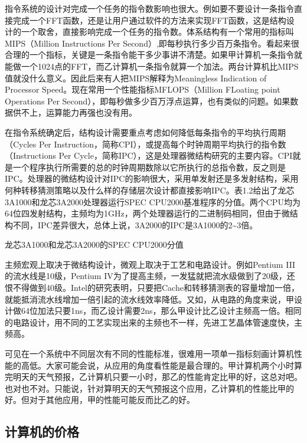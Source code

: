 \documentclass[]{ctexbook}
\begin{document}
指令系统的设计对完成一个任务的指令数影响也很大。例如要不要设计一条指令直接完成一个FFT函数，还是让用户通过软件的方法来实现FFT函数，这是结构设计的一个取舍，直接影响完成一个任务的指令数。体系结构有一个常用的指标叫MIPS（Million Instructions Per Second）,即每秒执行多少百万条指令。看起来很合理的一个指标，关键是一条指令能干多少事讲不清楚。如果甲计算机一条指令就能做一个1024点的FFT，而乙计算机一条指令就算一个加法。两台计算机比MIPS值就没什么意义。因此后来有人把MIPS解释为Meaningless Indication of Processor Speed。现在常用一个性能指标MFLOPS（Million FLoating point Operations Per Second），即每秒做多少百万浮点运算，也有类似的问题。如果数据供不上，运算能力再强也没有用。

在指令系统确定后，结构设计需要重点考虑如何降低每条指令的平均执行周期（Cycles Per Instruction，简称CPI），或提高每个时钟周期平均执行的指令数（Instructions Per Cycle，简称IPC），这是处理器微结构研究的主要内容。CPI就是一个程序执行所需要的总的时钟周期数除以它所执行的总指令数，反之则是IPC。处理器的微结构设计对IPC的影响很大，采用单发射还是多发射结构，采用何种转移猜测策略以及什么样的存储层次设计都直接影响IPC。表1.2给出了龙芯3A1000和龙芯3A2000处理器运行SPEC CPU2000基准程序的分值。两个CPU均为64位四发射结构，主频均为1GHz，两个处理器运行的二进制码相同，但由于微结构不同，IPC差异很大，总体上说，3A2000的IPC是3A1000的2\textasciitilde3倍。

\label{tab:spec-cpu}龙芯3A1000和龙芯3A2000的SPEC CPU2000分值

主频宏观上取决于微结构设计，微观上取决于工艺和电路设计。例如Pentium III的流水线是10级，Pentium IV为了提高主频，一发猛就把流水级做到了20级，还恨不得做到40级。Intel的研究表明，只要把Cache和转移猜测表的容量增加一倍，就能抵消流水线增加一倍引起的流水线效率降低。又如，从电路的角度来说，甲设计做64位加法只要1ns，而乙设计需要2ns，那么甲设计比乙设计主频高一倍。相同的电路设计，用不同的工艺实现出来的主频也不一样，先进工艺晶体管速度快，主频高。

可见在一个系统中不同层次有不同的性能标准，很难用一项单一指标刻画计算机性能的高低。大家可能会说，从应用的角度看性能是最合理的。甲计算机两个小时算完明天的天气预报，乙计算机只要一小时，那乙的性能肯定比甲的好，这总对吧。也对也不对。只能说，针对算明天的天气预报这个应用，乙计算机的性能比甲的好。但对于其他应用，甲的性能可能反而比乙的好。

\hypertarget{ux8ba1ux7b97ux673aux7684ux4ef7ux683c}{%
\subsection{计算机的价格}\label{ux8ba1ux7b97ux673aux7684ux4ef7ux683c}}
\end{document}
